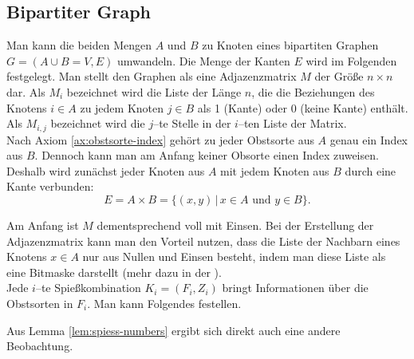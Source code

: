 \subsection{Bipartiter Graph}
Man kann die beiden Mengen $A$ und $B$ zu Knoten eines bipartiten Graphen $G = (A \cup B = V, E)$ umwandeln.
Die Menge der Kanten $E$ wird im Folgenden festgelegt.
Man stellt den Graphen als eine Adjazenzmatrix $M$ der Größe $n \times n$ dar. 
Als $M_i$ bezeichnet wird die Liste der Länge $n$,
die die Beziehungen des Knotens
$i \in A$ zu jedem Knoten $j \in B$ als 1 (Kante) oder 0 (keine Kante) enthält.
Als $M_{i, j}$ bezeichnet wird die $j$--te Stelle in der $i$--ten Liste der Matrix.\\
Nach Axiom \ref{ax:obstsorte-index} gehört zu jeder Obstsorte aus $A$ genau ein Index aus $B$.
Dennoch kann man am Anfang keiner Obsorte einen Index zuweisen.
Deshalb wird zunächst jeder Knoten aus $A$ mit jedem Knoten aus $B$ durch eine Kante verbunden:
\[
E = A\times B = \{(x, y) \,|\,  x \in A \text{ und } y \in B\}.
\]

Am Anfang ist $M$ dementsprechend voll mit Einsen.
Bei der Erstellung der Adjazenzmatrix kann man den Vorteil nutzen, dass die 
Liste der Nachbarn eines Knotens $x \in A$ nur aus Nullen und Einsen besteht, indem man
diese Liste als eine Bitmaske darstellt (mehr dazu in der ).\\

Jede $i$--te Spießkombination $K_i = (F_i, Z_i)$ bringt Informationen über die Obstsorten in $F_i$.
Man kann Folgendes festellen. 







\noindent Aus Lemma \ref{lem:spiess-numbers} ergibt sich direkt auch eine andere Beobachtung.




